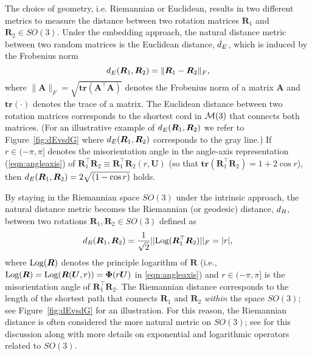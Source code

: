 The choice of geometry, i.e.\!\! Riemannian or Euclidean, results in two different metrics to measure the distance
between two rotation matrices $\bm{R}_1$ and $\bm{R}_2 \in SO(3)$. Under the embedding approach, the natural distance
metric between two random matrices is the Euclidean distance, ${d_E} $, which is induced by the Frobenius norm
\begin{equation}
\label{d_E}
{d_E} (\bm{R}_1,\bm{R}_2)=\|\bm{R}_1-\bm{R}_2\|_F, 
\end{equation}
where $\|\bm{A}\|_F = \sqrt{\mathbf{tr}({\bm A^\top \bm A})}$ denotes the Frobenius norm of a matrix $\bm A$ and $\mathbf{tr}(\cdot)$ denotes the trace of a matrix.  The Euclidean distance between two rotation matrices corresponds to the shortest cord in $\mathcal{M}(3)$  that connects both matrices. (For an illustrative example of ${d_E} (\bm{R}_1,\bm{R}_2)$ we refer to Figure~\ref{fig:dEvsdG} where ${d_E} (\bm{R}_1,\bm{R}_2)$ corresponds to the gray line.)  If $r\in(-\pi,\pi]$ denotes the misorientation angle in the angle-axis representation (\ref{eqn:angleaxis}) of $\bm{R}_1^\top \bm{R}_2 \equiv \bm{R}_1^\top \bm{R}_2(r,\bm{U})$ (so that $\mathbf{tr}(\bm{R}_1^\top \bm{R}_2) =1 +2 \cos r$), then ${d_E} (\bm{R}_1,\bm{R}_2) = 2\sqrt{(1-\cos r)}$ holds.

By staying in the Riemannian space $SO(3)$ under the intrinsic approach, the natural distance metric becomes the Riemannian (or geodesic) distance, ${d_R} $, between two rotations $\bm{R}_1,\bm{R}_2\in SO(3)$ defined as
\begin{equation}
\label{d_R}
{d_R} (\bm{R}_1,\bm{R}_2)=  \frac{1}{\sqrt{2}}||
\text{Log}(\bm{R}_1^\top\bm{R}_2)||_F = |r|,
\end{equation}
where $\text{Log}(\bm{R})$ denotes the principle logarithm of $\bm{R}$ (i.e., $\text{Log}(\bm{R}) = \text{Log}(\bm{R}(\bm U,r))= \bm \Phi(r\bm U)$ in \eqref{eqn:angleaxis}) and $r\in(-\pi,\pi]$   is the misorientation angle of $\bm{R}_1^\top \bm{R}_2$.  The Riemannian distance corresponds to the length of the shortest path that connects $\bm{R}_1$ and $\bm{R}_2$ {\it within} the space $SO(3)$; see Figure~\ref{fig:dEvsdG} for an illustration. For this reason, the Riemannian distance is often considered the more natural metric on $SO(3)$; see \cite{moakher02} for this discussion along with more details on exponential and logarithmic operators related to $SO(3)$.    
 

